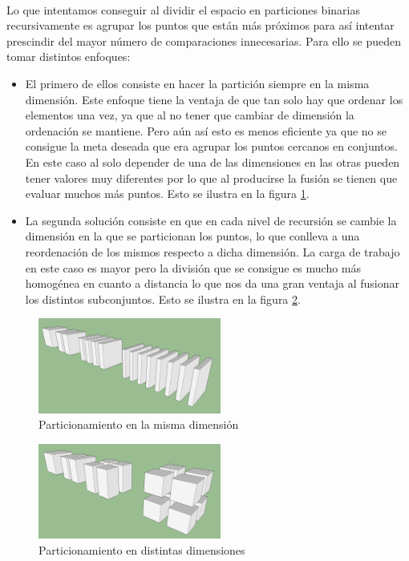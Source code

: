 \documentclass{article}
\begin{document}
		\paragraph{}
		Lo que intentamos conseguir al dividir el espacio en particiones binarias recursivamente es agrupar los puntos que están más próximos para así intentar prescindir del mayor número de comparaciones innecesarias. Para ello se pueden tomar distintos enfoques:
		
		\begin{itemize}
		
			\item 
			El primero de ellos consiste en hacer la partición siempre en la misma dimensión. Este enfoque tiene la ventaja de que tan solo hay que ordenar los elementos una vez, ya que al no tener que cambiar de dimensión la ordenación se mantiene. Pero aún así esto es menos eficiente ya que no se consigue la meta deseada que era agrupar los puntos cercanos en conjuntos. En este caso al solo depender de una de las dimensiones en las otras pueden tener valores muy diferentes por lo que al producirse la fusión se tienen que evaluar muchos más puntos. Esto se ilustra en la figura \ref{same_dim}. 
			
			\item 
			La segunda solución consiste en que en cada nivel de recursión se cambie la dimensión en la que se particionan los puntos, lo que conlleva a una reordenación de los mismos respecto a dicha dimensión. La carga de trabajo en este caso es mayor pero la división que se consigue es mucho más homogénea en cuanto a distancia lo que nos da una gran ventaja al fusionar los distintos subconjuntos. Esto se ilustra en la figura \ref{different_dim}. 

		\end{itemize}



	\begin{figure}[ht!]
		\centering
		\includegraphics[width=60mm]{cube_division_1.jpg}
		\caption{Particionamiento en la misma dimensión \label{same_dim}}
	\end{figure}

	\begin{figure}[ht!]
		\centering
		\includegraphics[width=60mm]{cube_division_2.jpg}
		\caption{Particionamiento en distintas dimensiones \label{different_dim}}
	\end{figure}
\end{document}

